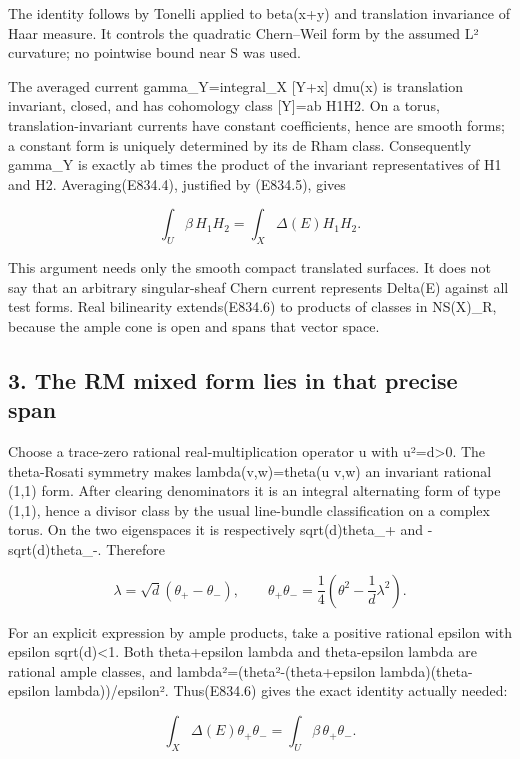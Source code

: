 The identity follows by Tonelli applied to \textbar beta(x+y)\textbar{}
and translation invariance of Haar measure. It controls the quadratic
Chern--Weil form by the assumed L² curvature; no pointwise bound near S
was used.

The averaged current gamma\_Y=integral\_X {[}Y+x{]} dmu(x) is
translation invariant, closed, and has cohomology class {[}Y{]}=ab H1H2.
On a torus, translation-invariant currents have constant coefficients,
hence are smooth forms; a constant form is uniquely determined by its de
Rham class. Consequently gamma\_Y is exactly ab times the product of the
invariant representatives of H1 and H2. Averaging(E834.4), justified by
(E834.5), gives

\[
 \int_U\beta\,H_1H_2
   =\int_X\Delta(E)H_1H_2.
 \tag{E834.6}
\]

This argument needs only the smooth compact translated surfaces. It does
not say that an arbitrary singular-sheaf Chern current represents
Delta(E) against all test forms. Real bilinearity extends(E834.6) to
products of classes in NS(X)\_R, because the ample cone is open and
spans that vector space.

\subsection{3. The RM mixed form lies in that precise
span}\label{SF-E834:the-rm-mixed-form-lies-in-that-precise-span}

Choose a trace-zero rational real-multiplication operator u with
u²=d\textgreater0. The theta-Rosati symmetry makes lambda(v,w)=theta(u
v,w) an invariant rational (1,1) form. After clearing denominators it is
an integral alternating form of type (1,1), hence a divisor class by the
usual line-bundle classification on a complex torus. On the two
eigenspaces it is respectively sqrt(d)theta\_+ and -sqrt(d)theta\_-.
Therefore

\[
 \lambda=\sqrt d(\theta_+-\theta_-),\qquad
 \theta_+\theta_-=\frac14\left(\theta^2-\frac1d\lambda^2\right).
 \tag{E834.7}
\]

For an explicit expression by ample products, take a positive rational
epsilon with epsilon sqrt(d)\textless1. Both theta+epsilon lambda and
theta-epsilon lambda are rational ample classes, and
lambda²=(theta²-(theta+epsilon lambda)(theta-epsilon lambda))/epsilon².
Thus(E834.6) gives the exact identity actually needed:

\[
 \int_X\Delta(E)\theta_+\theta_-
    =\int_U\beta\,\theta_+\theta_-.
 \tag{E834.8}
\]

